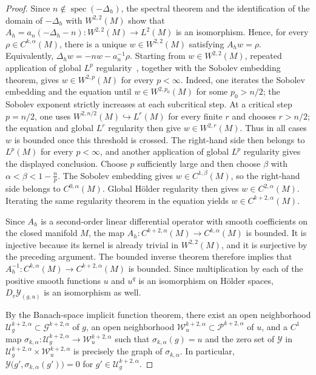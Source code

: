 \documentclass[12pt,oneside,a4paper]{article}
\theoremstyle{mytheorem}
\theoremstyle{remark}
\theoremstyle{definition}
\begin{document}
\begin{proof}
Since $n\notin\operatorname{spec}(-\Delta_h)$, the spectral theorem and the
identification of the domain of $-\Delta_h$ with $W^{2,2}(M)$ show that
\(A_h=a_n(-\Delta_h-n)\colon W^{2,2}(M)\to L^2(M)\)
is an isomorphism. Hence, for every $\rho\in C^{k,\alpha}(M)$, there is a
unique $w\in W^{2,2}(M)$ satisfying $A_h w=\rho$. Equivalently,
\(
\Delta_h w=-nw-a_n^{-1}\rho.
\)
Starting from $w\in W^{2,2}(M)$, repeated application of global $L^p$
regularity~\cite[Theorem~2.5(a)]{zbMATH04030435}, together with the Sobolev
embedding theorem, gives
\(w\in W^{2,p}(M)\)
for every \(p<\infty\).
Indeed, one iterates the Sobolev embedding and the equation until
$w\in W^{2,p_0}(M)$ for some $p_0>n/2$; the Sobolev exponent strictly
increases at each subcritical step. At a critical step $p=n/2$, one uses
$W^{2,n/2}(M)\hookrightarrow L^r(M)$ for every finite $r$ and chooses
$r>n/2$; the equation and global $L^r$ regularity then give
$w\in W^{2,r}(M)$. Thus in all cases $w$ is bounded once this threshold is
crossed. The right-hand side then belongs to $L^p(M)$ for every $p<\infty$,
and another
application of global $L^p$ regularity gives the displayed conclusion. Choose
$p$ sufficiently large and then choose $\beta$ with
\(\alpha<\beta<1-\frac np\).
The Sobolev embedding gives $w\in C^{1,\beta}(M)$, so the right-hand side belongs to
$C^{0,\alpha}(M)$. Global H\"older regularity
\cite[Theorem~2.5(b)]{zbMATH04030435} then gives $w\in C^{2,\alpha}(M)$.
Iterating the same regularity theorem in the equation yields
\(
w\in C^{k+2,\alpha}(M).
\)

Since $A_h$ is a second-order linear differential operator with smooth
coefficients on the closed manifold $M$, the map
\(A_h\colon C^{k+2,\alpha}(M)\to  C^{k,\alpha}(M)\)
is bounded. It is injective because its kernel is already trivial in
$W^{2,2}(M)$,
and it is surjective by the preceding argument. The bounded inverse theorem
therefore implies that
\(A_h^{-1}\colon C^{k,\alpha}(M)\to C^{k+2,\alpha}(M)\)
is bounded.
Since multiplication by each of the positive smooth functions \(u\) and
\(u^q\) is an isomorphism on H\"older spaces,
\(D_v\mathcal Y_{(g,u)}\) is an isomorphism as well.

By the Banach-space implicit function theorem, there exist an open
neighborhood
$\mathcal{U}_g^{k+2,\alpha}\subset\mathcal{G}^{k+2,\alpha}$ of $g$, an open
neighborhood $\mathcal{W}_u^{k+2,\alpha}\subset\mathcal{P}^{k+2,\alpha}$
of $u$, and a $C^1$ map
\(\sigma_{k,\alpha}\colon
\mathcal{U}_g^{k+2,\alpha}\to\mathcal{W}_u^{k+2,\alpha}\)
such that $\sigma_{k,\alpha}(g)=u$ and the zero set of $\mathcal Y$ in
$\mathcal{U}_g^{k+2,\alpha}\times\mathcal{W}_u^{k+2,\alpha}$ is precisely
the graph of $\sigma_{k,\alpha}$. In particular,
\(\mathcal Y\bigl(g',\sigma_{k,\alpha}(g')\bigr)=0\)
for \(g'\in\mathcal{U}_g^{k+2,\alpha}\).


\end{proof}
\end{document}
